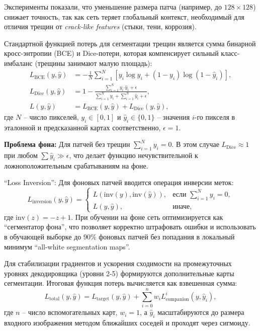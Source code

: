Эксперименты показали, что уменьшение размера патча (например, до $128 \times 128$) снижает точность, так как сеть теряет глобальный контекст, необходимый для отличия трещин от \textit{crack-like features} (стыки, тени, коррозия).

Стандартной функцией потерь для сегментации трещин является сумма бинарной кросс-энтропии (BCE) и Dice-потери, которая компенсирует сильный класс-имбаланс (трещины занимают малую площадь):
\begin{align}
    L_{\text{BCE}}(y, \hat{y}) &= -\frac{1}{N} \sum_{i=1}^{N} \left[ y_i \log \hat{y}_i + (1 - y_i) \log(1 - \hat{y}_i) \right], \\
    L_{\text{Dice}}(y, \hat{y}) &= 1 - \frac{\sum_{i=1}^{N} y_i \mathord{\cdot} \hat{y}_i + \epsilon}{\sum_{i=1}^{N} y_i + \sum_{i=1}^{N} \hat{y}_i + \epsilon}, \\
    L(y, \hat{y}) &= L_{\text{BCE}}(y, \hat{y}) + L_{\text{Dice}}(y, \hat{y}),
\end{align}
где $N$ -- число пикселей, $y_i \in [0,1]$ и $\hat{y}_i \in \{0,1\}$ -- значения $i$-го пикселя в эталонной и предсказанной картах соответственно, $\epsilon=1$.

\textbf{Проблема фона:} Для патчей без трещин $\sum_{i=1}^{N} y_i = 0$. В этом случае $L_{\text{Dice}} \approx 1$ при любом $\sum \hat{y}_i \gg \epsilon$, что делает функцию нечувствительной к ложноположительным срабатываниям на фоне.

\enquote{Loss Inversion}: Для фоновых патчей вводится операция инверсии меток:
\begin{equation}
    L_{\text{inversion}}(y, \hat{y}) = 
    \begin{cases}
        L(\text{inv}(y), \text{inv}(\hat{y})), & \text{если } \sum_{i=1}^{N} y_i = 0, \\
        L(y, \hat{y}), & \text{иначе},
    \end{cases}
\end{equation}
где $\text{inv}(z) = -z + 1$. При обучении на фоне сеть оптимизируется как \enquote{сегментатор фона}, что позволяет корректно штрафовать ошибки и использовать в обучающей выборке до 90\% фоновых патчей без попадания в локальный минимум \enquote{all-white segmentation maps}.

Для стабилизации градиентов и ускорения сходимости на промежуточных уровнях декодировщика (уровни 2-5) формируются дополнительные карты сегментации. Итоговая функция потерь вычисляется как взвешенная сумма:
\begin{equation}
    L_{\text{total}}(y, \hat{y}) = L_{\text{target}}(y, \hat{y}) + \sum_{i=0}^{n} w_i L_{\text{companion}}^i(y, \hat{y}_i),
\end{equation}
где $n$ -- число вспомогательных карт, ${w_i = 1}$, а $\hat{y}_i$ масштабируются до размера входного изображения методом ближайших соседей и проходят через сигмоиду.

